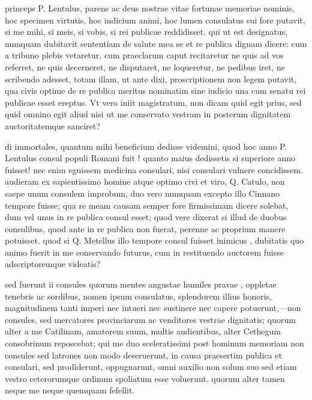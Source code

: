  princeps P. Lentulus, parens ac deus nostrae vitae fortunae memoriae nominis, hoc specimen virtutis, hoc indicium animi, hoc lumen consulatus sui fore putavit, si me mihi, si meis, si vobis, si rei publicae reddidisset. qui ut est designatus, numquam dubitavit sententiam de salute mea se et re publica dignam dicere: cum a tribuno plebis vetaretur, cum praeclarum caput recitaretur ne quis ad vos referret, ne quis decerneret, ne disputaret, ne loqueretur, ne pedibus iret, ne scribendo adesset, totam illam, ut ante dixi, proscriptionem non legem putavit, qua civis optime de re publica meritus nominatim sine iudicio una cum senatu rei publicae esset ereptus. Vt vero iniit magistratum, non dicam quid egit prius, sed quid omnino egit aliud nisi ut me conservato vestram in posterum dignitatem auctoritatemque sanciret?

 di immortales, quantum mihi beneficium dedisse videmini, quod hoc anno P. Lentulus consul populi Romani fuit ! quanto maius dedissetis si superiore anno fuisset! nec enim eguissem medicina consulari, nisi consulari vulnere concidissem. audieram ex sapientissimo homine atque optimo civi et viro, Q. Catulo, non saepe unum consulem improbum, duo vero numquam excepto illo Cinnano tempore fuisse; qua re meam causam semper fore firmissimam dicere solebat, dum vel unus in re publica consul esset; quod vere dixerat si illud de duobus consulibus, quod ante in re publica non fuerat, perenne ac proprium manere potuisset. quod si Q. Metellus illo tempore consul fuisset inimicus , dubitatis quo animo fuerit in me conservando futurus, cum in restituendo auctorem fuisse adscriptoremque videatis?

 sed fuerunt ii consules quorum mentes angustae humiles pravae , oppletae tenebris ac sordibus, nomen ipsum consulatus, splendorem illius honoris, magnitudinem tanti imperi nec intueri nec sustinere nec capere potuerunt,—non consules, sed mercatores provinciarum ac venditores vestrae dignitatis; quorum alter a me Catilinam, amatorem suum, multis audientibus, alter Cethegum consobrinum reposcebat; qui me duo sceleratissimi post hominum memoriam non consules sed latrones non modo deseruerunt, in causa praesertim publica et consulari, sed prodiderunt, oppugnarunt, omni auxilio non solum suo sed etiam vestro ceterorumque ordinum spoliatum esse voluerunt. quorum alter tamen neque me neque quemquam fefellit.

